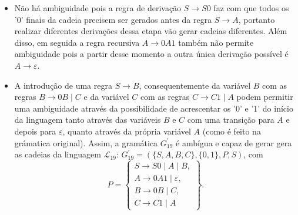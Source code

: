 \documentclass[12pt]{article}
\def\myling{{19}} %
\newcommand{\ve}{\ensuremath{\varepsilon}}
\begin{document}
\begin{tcolorbox}[breakable,rounded corners, colback=yellow!5, colframe=red!40!black, title={$G_{\myling}$ não é ambígua.}]
 \begin{itemize}
  \item Não há ambiguidade pois a regra de derivação $S\to S0$ faz com que todos os '0' finais da cadeia precisem ser gerados antes da regra $S \to A$, portanto realizar diferentes derivações dessa etapa vão gerar cadeias diferentes. Além disso, em seguida a regra recursiva $A \to 0A1$ também não permite ambiguidade pois a partir desse momento a outra única derivação possível é $A \to \ve$.
  \item A introdução de uma regra $S\to B$, consequentemente da variável $B$ com as regras $B\to 0B\mid C$ e da variável $C$ com as regras $C\to C1\mid A$ podem permitir uma ambiguidade através da possibilidade de acrescentar os '0' e '1' do início da linguagem tanto através das variáveis $B$ e $C$ com uma transição para $A$ e depois para $\varepsilon$, quanto através da própria variável $A$ (como é feito na grámatica original). Assim, a gramática $G^\prime_{\myling}$ é ambígua e capaz de gerar gera as cadeias da linguagem $\mathcal{L}_{\myling}$:  $G^\prime_{\myling}=(\{S,A,B,C\},\{0,1\},P,S)$, com
    $$
     P =
        \left\{\begin{array}{l}
        S\to S0\mid A\mid B,     \\
        A\to 0A1\mid \varepsilon,\\
        B\to 0B\mid C,           \\
        C\to C1\mid A
        \end{array}\right\}.
    $$
 \end{itemize}
\end{tcolorbox}
\end{document}
